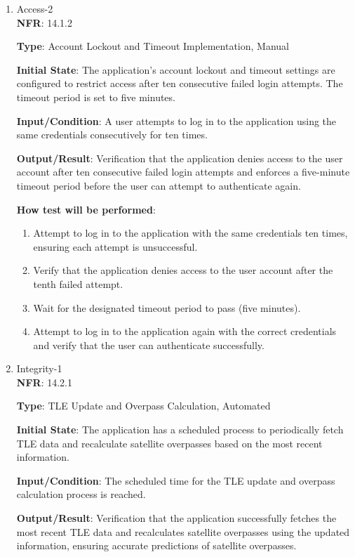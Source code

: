 \documentclass[12pt, titlepage]{article}
\begin{document}
\begin{enumerate}
\begin{enumerate}
\end{enumerate}


\item {Access-2\\}
\textbf{NFR}: 14.1.2

\textbf{Type}: Account Lockout and Timeout Implementation, Manual

\textbf{Initial State}: The application's account lockout and timeout settings are configured to restrict access after ten consecutive failed login attempts. The timeout period is set to five minutes.


\textbf{Input/Condition}:   A user attempts to log in to the application using the same credentials consecutively for ten times.

\textbf{Output/Result}: Verification that the application denies access to the user account after ten consecutive failed login attempts and enforces a five-minute timeout period before the user can attempt to authenticate again.

\textbf{How test will be performed}: 
\begin{enumerate}
    \item Attempt to log in to the application with the same credentials ten times, ensuring each attempt is unsuccessful.

    \item Verify that the application denies access to the user account after the tenth failed attempt.
    \item Wait for the designated timeout period to pass (five minutes).

    \item Attempt to log in to the application again with the correct credentials and verify that the user can authenticate successfully.

\end{enumerate}

\item {Integrity-1\\}
\textbf{NFR}: 14.2.1

\textbf{Type}: TLE Update and Overpass Calculation, Automated

\textbf{Initial State}: The application has a scheduled process to periodically fetch TLE data and recalculate satellite overpasses based on the most recent information.


\textbf{Input/Condition}: The scheduled time for the TLE update and overpass calculation process is reached.


\textbf{Output/Result}: Verification that the application successfully fetches the most recent TLE data and recalculates satellite overpasses using the updated information, ensuring accurate predictions of satellite overpasses.



\end{enumerate}
\end{document}
